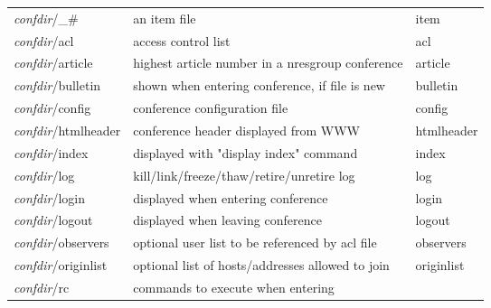 \documentclass[twoside]{report}
\begin{document}
\begin{supertabular}{lp{7cm}l}
            {\em confdir}/\_\#         
                             & an item file
                             & item \\
            {\em confdir}/acl        
                             & access control list
                             &acl \\
            {\em confdir}/article    
                             & highest article number in a nresgroup conference 
                             &article \\
            {\em confdir}/bulletin   
                             & shown when entering conference, if file is new
                             &bulletin \\
            {\em confdir}/config     
                             & conference configuration file          
                             &config \\
            {\em confdir}/htmlheader 
                             & conference header displayed from WWW
                             & htmlheader \\
            {\em confdir}/index      
                             & displayed with "display index" command
                             & index \\
            {\em confdir}/log        
                             & kill/link/freeze/thaw/retire/unretire log
                             & log \\
            {\em confdir}/login      
                             & displayed when entering conference
                             & login \\
            {\em confdir}/logout     
                             & displayed when leaving conference
                             & logout \\
            {\em confdir}/observers  
                             & optional user list to be referenced by acl file
                             & observers  \\
            {\em confdir}/originlist 
                             & optional list of hosts/addresses allowed to join 
                             & originlist \\
            {\em confdir}/rc         
                             & commands to execute when entering

\end{supertabular}
\end{document}
